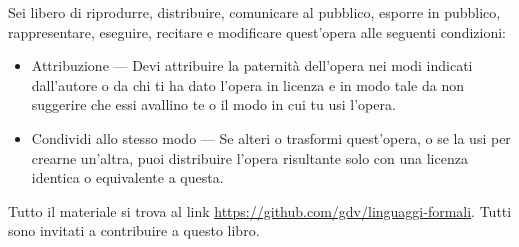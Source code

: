 \documentclass[
a4paper,
fontsize=10pt, %
twoside=false, %
numbers=auto, %
fontmethod = modern,
]{kaobook}
\begin{document}
\doclicenseThis%
Sei libero di riprodurre, distribuire, comunicare al pubblico, esporre
in pubblico, rappresentare, eseguire, recitare e modificare quest'opera
alle seguenti condizioni:
\begin{itemize}
\item
Attribuzione — Devi attribuire la paternit{\`a} dell'opera nei modi
indicati dall'autore o da chi ti ha dato l'opera in licenza e in modo tale da
non suggerire che essi avallino te o il modo in cui tu usi l'opera.
\item
Condividi allo stesso modo — Se alteri o trasformi quest'opera, o se
la usi per crearne un'altra, puoi distribuire l'opera risultante solo con
una licenza identica o equivalente a  questa.
\end{itemize}

Tutto il materiale si trova al link
\url{https://github.com/gdv/linguaggi-formali}.
Tutti sono invitati a contribuire a questo libro.
\newpage

%



\begingroup %

\setlength{\textheight}{230\hscale} %

\etocstandarddisplaystyle %
\etocstandardlines %

\tableofcontents %

\endgroup

\end{document}
